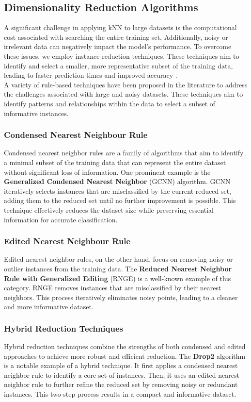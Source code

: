 \subsection{Dimensionality Reduction Algorithms}
\label{subsec:methods-reduction}

A significant challenge in applying kNN to large datasets is the computational cost 
associated with searching the entire training set. Additionally, noisy or irrelevant 
data can negatively impact the model's performance. 
To overcome these issues, we employ instance reduction techniques. 
These techniques aim to identify and select a smaller, more representative subset of
the training data, leading to faster prediction times and improved accuracy \cite{Wilson2000}.\\

A variety of rule-based techniques have been proposed in the literature to 
address the challenges associated with large and noisy datasets. 
These techniques aim to identify patterns and relationships within the data to select 
a subset of informative instances.

\subsubsection{Condensed Nearest Neighbour Rule}
Condensed nearest neighbor rules are a family of algorithms that aim to identify 
a minimal subset of the training data that can represent the entire dataset without 
significant loss of information. One prominent example is the \textbf{Generalized Condensed 
Nearest Neighbor} (GCNN) algorithm.
GCNN iteratively selects instances that are misclassified by the current reduced set, 
adding them to the reduced set until no further improvement is possible. 
This technique effectively reduces the dataset size while preserving essential 
information for accurate classification.


\subsubsection{Edited Nearest Neighbour Rule}
Edited nearest neighbor rules, on the other hand, focus on removing noisy or outlier 
instances from the training data. The \textbf{Reduced Nearest Neighbor Rule with Generalized
Editing} (RNGE) is a well-known example of this category. RNGE removes instances 
that are misclassified by their nearest neighbors. This process iteratively eliminates
 noisy points, leading to a cleaner and more informative dataset.


\subsubsection{Hybrid Reduction Techniques}
Hybrid reduction techniques combine the strengths of both condensed and edited approaches
to achieve more robust and efficient reduction. The \textbf{Drop2} algorithm is a notable example
of a hybrid technique. It first applies a condensed nearest neighbor rule to identify a
core set of instances. Then, it uses an edited nearest neighbor rule to further refine
the reduced set by removing noisy or redundant instances.
This two-step process results in a compact and informative dataset.